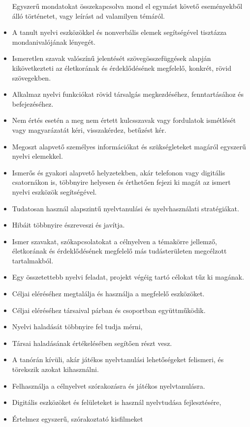 \begin{itemize}
  Egyszerű mondatokat összekapcsolva mond el egymást követő eseményekből
  álló történetet, vagy leírást ad valamilyen témáról.
\item
  A tanult nyelvi eszközökkel és nonverbális elemek segítségével
  tisztázza mondanivalójának lényegét.
\item
  Ismeretlen szavak valószínű jelentését szövegösszefüggések alapján
  kikövetkezteti az életkorának és érdeklődésének megfelelő, konkrét,
  rövid szövegekben.
\item
  Alkalmaz nyelvi funkciókat rövid társalgás megkezdéséhez,
  fenntartásához és befejezéséhez.
\item
  Nem értés esetén a meg nem értett kulcsszavak vagy fordulatok
  ismétlését vagy magyarázatát kéri, visszakérdez, betűzést kér.
\item
  Megoszt alapvető személyes információkat és szükségleteket magáról
  egyszerű nyelvi elemekkel.
\item
  Ismerős és gyakori alapvető helyzetekben, akár telefonon vagy
  digitális csatornákon is, többnyire helyesen és érthetően fejezi ki
  magát az ismert nyelvi eszközök segítségével.
\item
  Tudatosan használ alapszintű nyelvtanulási és nyelvhasználati
  stratégiákat.
\item
  Hibáit többnyire észreveszi és javítja.
\item
  Ismer szavakat, szókapcsolatokat a célnyelven a témakörre jellemző,
  életkorának és érdeklődésének megfelelő más tudásterületen megcélzott
  tartalmakból.
\item
  Egy összetettebb nyelvi feladat, projekt végéig tartó célokat tűz ki
  magának.
\item
  Céljai eléréséhez megtalálja és használja a megfelelő eszközöket.
\item
  Céljai eléréséhez társaival párban és csoportban együttműködik.
\item
  Nyelvi haladását többnyire fel tudja mérni,
\item
  Társai haladásának értékelésében segítően részt vesz.
\item
  A tanórán kívüli, akár játékos nyelvtanulási lehetőségeket felismeri,
  és törekszik azokat kihasználni.
\item
  Felhasználja a célnyelvet szórakozásra és játékos nyelvtanulásra.
\item
  Digitális eszközöket és felületeket is használ nyelvtudása
  fejlesztésére,
\item
  Értelmez egyszerű, szórakoztató kisfilmeket

\end{itemize}
